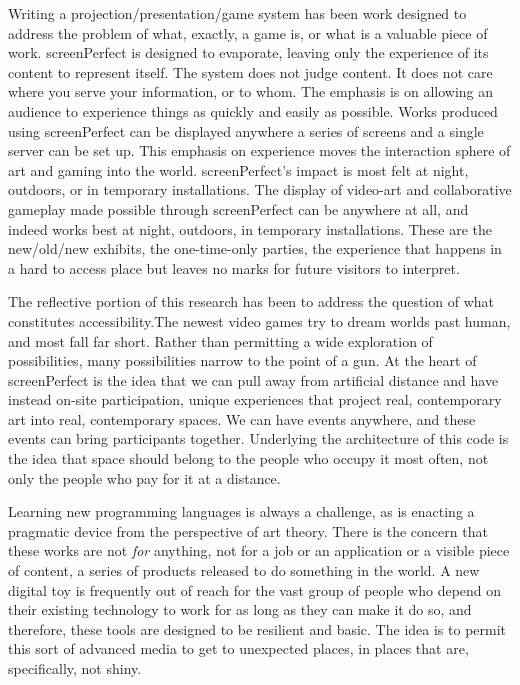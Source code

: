 Writing a projection/presentation/game system has been work designed to address the problem of what, exactly, a game is, or what is a valuable piece of work. screenPerfect is designed to evaporate, leaving only the experience of its content to represent itself. The system does not judge content. It does not care where you serve your information, or to whom. The emphasis is on allowing an audience to experience things as quickly and easily as possible. Works produced using screenPerfect can be displayed anywhere a series of screens and a single server can be set up. This emphasis on experience moves the interaction sphere of art and gaming into the world. screenPerfect's impact is most felt at night, outdoors, or in temporary installations. The display of video-art and collaborative gameplay made possible through screenPerfect can be anywhere at all, and indeed works best at night, outdoors, in temporary installations. These are the new/old/new exhibits, the one-time-only parties, the experience that happens in a hard to access place but leaves no marks for future visitors to interpret.

The reflective portion of this research has been to address the question of what constitutes accessibility.The newest video games try to dream worlds past human, and most fall far short. Rather than permitting a wide exploration of possibilities, many possibilities narrow to the point of a gun. At the heart of screenPerfect is the idea that we can pull away from artificial distance and have instead on-site participation, unique experiences that project real, contemporary art into real, contemporary spaces. We can have events anywhere, and these events can bring participants together. Underlying the architecture of this code is the idea that space should belong to the people who occupy it most often, not only the people who pay for it at a distance.

Learning new programming languages is always a challenge, as is enacting a pragmatic device from the perspective of art theory. There is the concern that these works are not \textit{for} anything, not for a job or an application or a visible piece of content, a series of products released to do something in the world. A new digital toy is frequently out of reach for the vast group of people who depend on their existing technology to work for as long as they can make it do so, and therefore, these tools are designed to be resilient and basic. The idea is to permit this sort of advanced media to get to unexpected places, in places that are, specifically, not shiny. 

